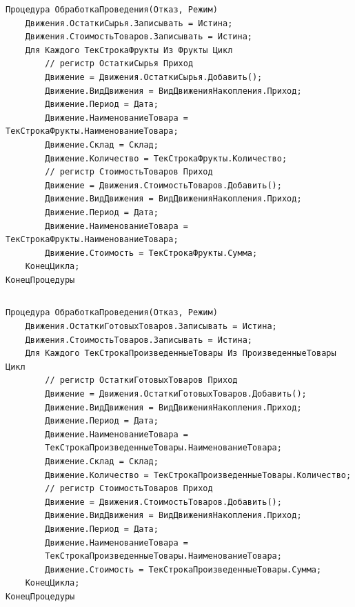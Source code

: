 \documentclass[12pt,a4paper]{article}
\begin{document}
\begin{appendices}
\begin{verbatim}
Процедура ОбработкаПроведения(Отказ, Режим)
    Движения.ОстаткиСырья.Записывать = Истина; 
    Движения.СтоимостьТоваров.Записывать = Истина;
    Для Каждого ТекСтрокаФрукты Из Фрукты Цикл 
        // регистр ОстаткиСырья Приход
        Движение = Движения.ОстаткиСырья.Добавить();
        Движение.ВидДвижения = ВидДвиженияНакопления.Приход;
        Движение.Период = Дата;
        Движение.НаименованиеТовара = ТекСтрокаФрукты.НаименованиеТовара;
        Движение.Склад = Склад;
        Движение.Количество = ТекСтрокаФрукты.Количество;
        // регистр СтоимостьТоваров Приход     
        Движение = Движения.СтоимостьТоваров.Добавить();
        Движение.ВидДвижения = ВидДвиженияНакопления.Приход;
        Движение.Период = Дата;
        Движение.НаименованиеТовара = ТекСтрокаФрукты.НаименованиеТовара;
        Движение.Стоимость = ТекСтрокаФрукты.Сумма;
	КонецЦикла;
КонецПроцедуры
\end{verbatim}

\begin{lstlisting}[caption=ОбработкаПроведения из модуля объекта Приходной накладной]
\end{lstlisting}

\begin{verbatim}
Процедура ОбработкаПроведения(Отказ, Режим)
    Движения.ОстаткиГотовыхТоваров.Записывать = Истина; 
    Движения.СтоимостьТоваров.Записывать = Истина;
    Для Каждого ТекСтрокаПроизведенныеТовары Из ПроизведенныеТовары Цикл 
        // регистр ОстаткиГотовыхТоваров Приход
        Движение = Движения.ОстаткиГотовыхТоваров.Добавить();
        Движение.ВидДвижения = ВидДвиженияНакопления.Приход;
        Движение.Период = Дата;
        Движение.НаименованиеТовара =
        ТекСтрокаПроизведенныеТовары.НаименованиеТовара;
        Движение.Склад = Склад;
        Движение.Количество = ТекСтрокаПроизведенныеТовары.Количество;
        // регистр СтоимостьТоваров Приход                                   
        Движение = Движения.СтоимостьТоваров.Добавить();
        Движение.ВидДвижения = ВидДвиженияНакопления.Приход;
        Движение.Период = Дата;
        Движение.НаименованиеТовара =
        ТекСтрокаПроизведенныеТовары.НаименованиеТовара;
        Движение.Стоимость = ТекСтрокаПроизведенныеТовары.Сумма;
    КонецЦикла;
КонецПроцедуры
\end{verbatim}

\begin{lstlisting}[caption=ОбработкаПроведения из модуля объекта Товараной накладной]
\end{lstlisting}


\end{appendices}
\end{document}
